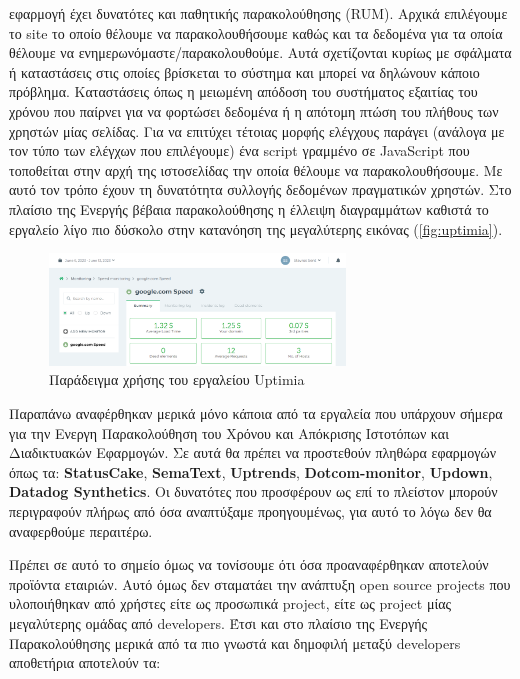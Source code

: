 \begin{itemize}
	      εφαρμογή έχει δυνατότες και παθητικής παρακολούθησης (RUM). Αρχικά επιλέγουμε το site το οποίο θέλουμε να παρακολουθήσουμε
	      καθώς και τα δεδομένα για τα οποία θέλουμε να ενημερωνόμαστε/παρακολουθούμε. Αυτά σχετίζονται κυρίως με σφάλματα ή
	      καταστάσεις στις οποίες βρίσκεται το σύστημα και μπορεί να δηλώνουν κάποιο πρόβλημα. Καταστάσεις όπως η μειωμένη απόδοση του συστήματος
	      εξαιτίας του χρόνου που παίρνει για να φορτώσει δεδομένα ή η απότομη πτώση του πλήθους των χρηστών μίας σελίδας.
	      Για να επιτύχει τέτοιας μορφής ελέγχους παράγει (ανάλογα με τον τύπο των ελέγχων που επιλέγουμε)
	      ένα script γραμμένο σε JavaScript που τοποθείται στην αρχή της ιστοσελίδας την οποία θέλουμε να παρακολουθήσουμε.
	      Με αυτό τον τρόπο έχουν τη δυνατότητα συλλογής δεδομένων πραγματικών χρηστών. Στο πλαίσιο της Ενεργής βέβαια παρακολούθησης
	      η έλλειψη διαγραμμάτων καθιστά το εργαλείο λίγο πιο δύσκολο στην κατανόηση της μεγαλύτερης εικόνας (\autoref{fig:uptimia}).
	      \begin{figure}[!ht]
		      \centering
		      \includegraphics[width=0.7\textwidth]{./images/chapter3/uptimia.png}
		      \caption[Παράδειγμα χρήσης του εργαλείου Uptimia]{Παράδειγμα χρήσης του εργαλείου Uptimia}
		      \label{fig:uptimia}
	      \end{figure}
\end{itemize}

Παραπάνω αναφέρθηκαν μερικά μόνο κάποια από τα εργαλεία που υπάρχουν σήμερα για την Ενεργη Παρακολούθηση του Χρόνου
και Απόκρισης Ιστοτόπων και Διαδικτυακών Εφαρμογών. Σε αυτά θα πρέπει να προστεθούν πληθώρα εφαρμογών όπως τα:
\textbf{StatusCake}, \textbf{SemaText}, \textbf{Uptrends}, \textbf{Dotcom-monitor}, \textbf{Updown}, \textbf{Datadog Synthetics}.
Οι δυνατότες που προσφέρουν ως επί το πλείστον μπορούν περιγραφούν πλήρως από όσα αναπτύξαμε προηγουμένως, για αυτό το λόγω δεν θα αναφερθούμε περαιτέρω.

Πρέπει σε αυτό το σημείο όμως να τονίσουμε ότι όσα προαναφέρθηκαν αποτελούν προϊόντα εταιριών.
Αυτό όμως δεν σταματάει την ανάπτυξη open source projects που υλοποιήθηκαν από χρήστες είτε ως προσωπικά project, είτε
ως project μίας μεγαλύτερης ομάδας από developers. Έτσι και στο πλαίσιο της Ενεργής Παρακολούθησης μερικά από τα πιο
γνωστά και δημοφιλή μεταξύ developers αποθετήρια αποτελούν τα:


